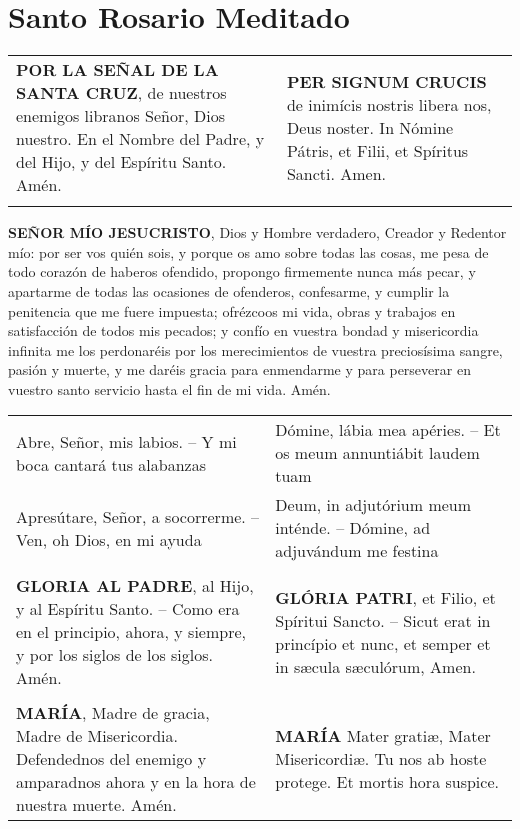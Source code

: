 \documentclass[./main.tex]{subfiles}
\begin{document}
\chapter*{Santo Rosario Meditado}

\begin{longtable} { p{} p{} }
      \label{crossSignal}
      \textbf{POR LA SEÑAL DE LA SANTA CRUZ}, de nuestros enemigos libranos Señor, Dios nuestro. En el Nombre del Padre,
      y del Hijo, y del Espíritu Santo. Amén.
          &
      \textbf{PER SIGNUM CRUCIS} de inimícis nostris libera nos, Deus noster. In Nómine Pátris, et Filii, et Spíritus Sancti. Amen.\\\\
\end{longtable}

\label{contrition}
\textbf{SEÑOR MÍO JESUCRISTO}, Dios y Hombre verdadero, Creador y Redentor mío: por ser vos quién sois, y porque os amo sobre todas las cosas,
me pesa de todo corazón de haberos ofendido, propongo firmemente nunca más pecar, y apartarme de todas las ocasiones de ofenderos,
confesarme, y cumplir la penitencia que me fuere impuesta; ofrézcoos mi vida, obras y trabajos en satisfacción de todos mis pecados;
y confío en vuestra bondad y misericordia infinita me los perdonaréis por los merecimientos de vuestra preciosísima sangre, pasión y muerte,
y me daréis gracia para enmendarme y para perseverar en vuestro santo servicio hasta el fin de mi vida. Amén.

\begin{longtable} {p{} p{} }
      Abre, Señor, mis labios. -- Y mi boca cantará tus alabanzas                                                           
            & 
      Dómine, lábia mea apéries. -- Et os meum annuntiábit laudem tuam\\
      Apresútare, Señor, a socorrerme. -- Ven, oh Dios, en mi ayuda                                                    
            & 
      Deum, in adjutórium meum inténde. -- Dómine, ad adjuvándum me festina\\\\

      \label{glory}
      \textbf{GLORIA AL PADRE}, al Hijo, y al Espíritu Santo. -- Como era en el principio, ahora, y siempre, y por los siglos de los siglos. Amén.                   
            & 
      \textbf{GLÓRIA PATRI}, et Filio, et Spíritui Sancto. -- Sicut erat in princípio et nunc, et semper et in sæcula sæculórum, Amen.\\\\
      
      \textbf{MARÍA}, Madre de gracia, Madre de Misericordia. Defendednos del enemigo y amparadnos ahora y en la hora de nuestra muerte. Amén.                               
            & 
      \textbf{MARÍA} Mater gratiæ, Mater Misericordiæ. Tu nos ab hoste protege. Et mortis hora suspice.

\end{longtable}
\end{document}

